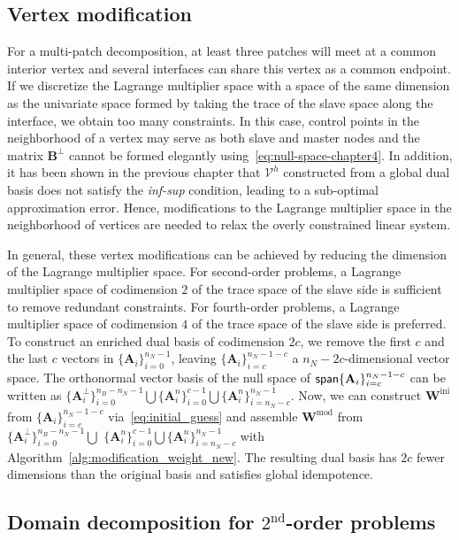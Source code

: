 \subsection{Vertex modification}

For a multi-patch decomposition, at least three patches will meet at a common interior vertex and several interfaces can share this vertex as a common endpoint. If we discretize the Lagrange multiplier space with a space of the same dimension as the univariate space formed by taking the trace of the slave space along the interface, we obtain too many constraints. In this case, control points in the neighborhood of a vertex may serve as both slave and master nodes and the matrix $\mathbf{B}^\perp$ cannot be formed elegantly using~\eqref{eq:null-space-chapter4}. In addition, it has been shown in the previous chapter that $\mathcal{V}^h$ constructed from a global dual basis does not satisfy the \textit{inf-sup} condition, leading to a sub-optimal approximation error. Hence, modifications to the Lagrange multiplier space in the neighborhood of vertices are needed to relax the overly constrained linear system.\par

In general, these vertex modifications can be achieved by reducing the dimension of the Lagrange multiplier space. For second-order problems, a Lagrange multiplier space of codimension $2$ of the trace space of the slave side is sufficient to remove redundant constraints. For fourth-order problems, a Lagrange multiplier space of codimension $4$ of the trace space of the slave side is preferred. To construct an enriched dual basis of codimension $2c$, we remove the first $c$ and the last $c$ vectors in $\{\mathbf{A}_i\}_{i=0}^{n_N-1}$, leaving $\{\mathbf{A}_i\}_{i=c}^{n_N-1-c}$ a $n_N-2c$-dimensional vector space. The orthonormal vector basis of the null space of $\operatorname{\mathsf{span}}\{\mathbf{A}_i\}_{i=c}^{n_N-1-c}$ can be written as $\{\mathbf{A}^\perp_i\}_{i=0}^{n_B-n_N-1}\bigcup\{\mathbf{A}^n_i\}_{i=0}^{c-1}\bigcup\{\mathbf{A}^n_i\}_{i=n_N-c}^{n_N-1}$. Now, we can construct $\mathbf{W}^\text{ini}$ from $\{\mathbf{A}_i\}_{i=c}^{n_N-1-c}$ via~\eqref{eq:initial_guess} and assemble $\mathbf{W}^\text{mod}$ from $\{\mathbf{A}^\perp_i\}_{i=0}^{n_B-n_N-1}\bigcup$ $\{\mathbf{A}^n_i\}_{i=0}^{c-1}\bigcup\{\mathbf{A}^n_i\}_{i=n_N-c}^{n_N-1}$ with Algorithm~\ref{alg:modification_weight_new}. The resulting dual basis has $2c$ fewer dimensions than the original basis and satisfies global idempotence.

\subsection{Domain decomposition for $2^\text{nd}$-order problems}

